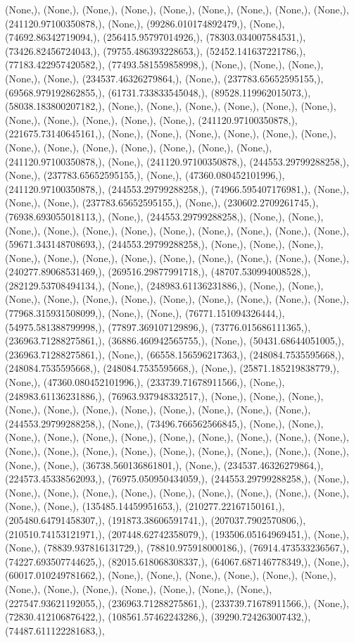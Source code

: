 \documentclass{article}
\begin{document}
(None,), (None,), (None,), (None,), (None,), (None,), (None,), (None,), (None,), (241120.97100350878,), (None,), (99286.010174892479,), (None,), (74692.86342719094,), (256415.95797014926,), (78303.034007584531,), (73426.82456724043,), (79755.486393228653,), (52452.141637221786,), (77183.422957420582,), (77493.581559858998,), (None,), (None,), (None,), (None,), (None,), (234537.46326279864,), (None,), (237783.65652595155,), (69568.979192862855,), (61731.733833545048,), (89528.119962015073,), (58038.183800207182,), (None,), (None,), (None,), (None,), (None,), (None,), (None,), (None,), (None,), (None,), (None,), (241120.97100350878,), (221675.73140645161,), (None,), (None,), (None,), (None,), (None,), (None,), (None,), (None,), (None,), (None,), (None,), (None,), (None,), (241120.97100350878,), (None,), (241120.97100350878,), (244553.29799288258,), (None,), (237783.65652595155,), (None,), (47360.080452101996,), (241120.97100350878,), (244553.29799288258,), (74966.595407176981,), (None,), (None,), (None,), (237783.65652595155,), (None,), (230602.2709261745,), (76938.693055018113,), (None,), (244553.29799288258,), (None,), (None,), (None,), (None,), (None,), (None,), (None,), (None,), (None,), (None,), (None,), (59671.343148708693,), (244553.29799288258,), (None,), (None,), (None,), (None,), (None,), (None,), (None,), (None,), (None,), (None,), (None,), (None,), (240277.89068531469,), (269516.29877991718,), (48707.530994008528,), (282129.53708494134,), (None,), (248983.61136231886,), (None,), (None,), (None,), (None,), (None,), (None,), (None,), (None,), (None,), (None,), (None,), (77968.315931508099,), (None,), (None,), (76771.151094326444,), (54975.581388799998,), (77897.369107129896,), (73776.015686111365,), (236963.71288275861,), (36886.460942565755,), (None,), (50431.68644051005,), (236963.71288275861,), (None,), (66558.156596217363,), (248084.7535595668,), (248084.7535595668,), (248084.7535595668,), (None,), (25871.185219838779,), (None,), (47360.080452101996,), (233739.71678911566,), (None,), (248983.61136231886,), (76963.937948332517,), (None,), (None,), (None,), (None,), (None,), (None,), (None,), (None,), (None,), (None,), (None,), (244553.29799288258,), (None,), (73496.766562566845,), (None,), (None,), (None,), (None,), (None,), (None,), (None,), (None,), (None,), (None,), (None,), (None,), (None,), (None,), (None,), (None,), (None,), (None,), (None,), (None,), (None,), (None,), (36738.560136861801,), (None,), (234537.46326279864,), (224573.45338562093,), (76975.050950434059,), (244553.29799288258,), (None,), (None,), (None,), (None,), (None,), (None,), (None,), (None,), (None,), (None,), (None,), (None,), (135485.14459951653,), (210277.22167150161,), (205480.64791458307,), (191873.38606591741,), (207037.7902570806,), (210510.74153121971,), (207448.62742358079,), (193506.05164969451,), (None,), (None,), (78839.937816131729,), (78810.975918000186,), (76914.473533236567,), (74227.693507744625,), (82015.618068308337,), (64067.687146778349,), (None,), (60017.010249781662,), (None,), (None,), (None,), (None,), (None,), (None,), (None,), (None,), (None,), (None,), (None,), (None,), (None,), (227547.93621192055,), (236963.71288275861,), (233739.71678911566,), (None,), (72830.412106876422,), (108561.57462243286,), (39290.724263007432,), (74487.611122281683,), 
\end{document}
